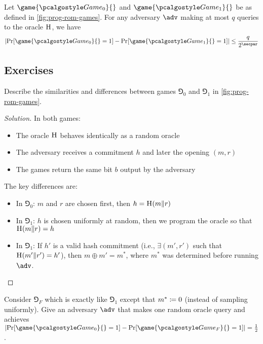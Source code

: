 \begin{proposition}\label{prop:prog-rom}
  Let $\game{\Game_0}{}$ and $\game{\Game_1}{}$ be as defined in \autoref{fig:prog-rom-games}.
  For any adversary $\adv$ making at most $q$ queries to the oracle ${\normalfont\textsc{H}}$, we have
  \[
  \left|\Pr[\game{\Game_0}{} = 1] - \Pr[\game{\Game_1}{} = 1]\right| \leq \frac{q}{2^\secpar}
  \]
\end{proposition}

\subsection{Exercises}

\begin{exercise}
  Describe the similarities and differences between games $\Game_0$ and $\Game_1$ in \autoref{fig:prog-rom-games}.
\end{exercise}

\begin{proof}[Solution]
  In both games:
  \begin{itemize}
    \item The oracle ${\normalfont\textsc{H}}$ behaves identically as a random oracle
    \item The adversary receives a commitment $h$ and later the opening $(m, r)$
    \item The games return the same bit $b$ output by the adversary
  \end{itemize}
  
  The key differences are:
  \begin{itemize}
    \item In $\Game_0$: $m$ and $r$ are chosen first, then $h = {\normalfont\textsc{H}}(m \| r)$
    \item In $\Game_1$: $h$ is chosen uniformly at random, then we program the oracle so that ${\normalfont\textsc{H}}(m \| r) = h$
    \item In $\Game_1$: If $h'$ is a valid hash commitment (i.e., $\exists (m', r')$ such that ${\normalfont\textsc{H}}(m' \| r') = h'$), then $m \oplus m' = m^*$, where $m^*$ was determined before running $\adv$.
  \end{itemize}
\end{proof}

\begin{exercise}
  Consider $\Game_F$ which is exactly like $\Game_1$ except that $m^* \coloneq 0$ (instead of sampling uniformly). Give an adversary $\adv$ that makes one random oracle query and achieves $\left|\Pr[\game{\Game_0}{} = 1] - \Pr[\game{\Game_F}{} = 1]\right| = \frac{1}{2}$.
\end{exercise}

